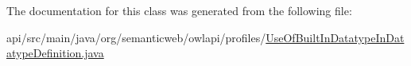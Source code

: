 The documentation for this class was generated from the following file\-:\begin{DoxyCompactItemize}
\item 
api/src/main/java/org/semanticweb/owlapi/profiles/\hyperlink{_use_of_built_in_datatype_in_datatype_definition_8java}{Use\-Of\-Built\-In\-Datatype\-In\-Datatype\-Definition.\-java}\end{DoxyCompactItemize}
